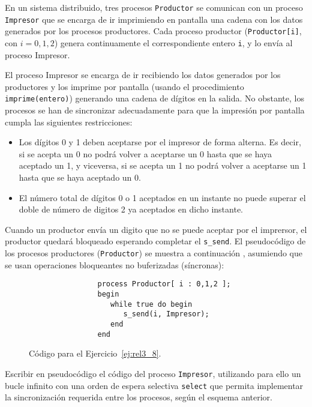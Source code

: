 \begin{ejercicio}\label{ej:rel3_8}
    En un sistema distribuido, tres procesos \verb|Productor| se comunican con un proceso \verb|Impresor| que se encarga de ir imprimiendo en pantalla una cadena con los datos generados por los procesos productores. Cada proceso productor (\verb|Productor[i]|, con $i=0,1,2$) genera continuamente el correspondiente entero \verb|i|, y lo envía al proceso Impresor.

    El proceso Impresor se encarga de ir recibiendo los datos generados por los productores y los imprime por pantalla (usando el procedimiento \verb|imprime(entero)|) generando una cadena de dígitos en la salida. No obstante, los procesos se han de sincronizar adecuadamente para que la impresión por pantalla cumpla las siguientes restricciones:
    \begin{itemize}
        \item Los dígitos 0 y 1 deben aceptarse por el impresor de forma alterna. Es decir, si se acepta un 0 no podrá volver a aceptarse un 0 hasta que se haya aceptado un 1, y viceversa, si se acepta un 1 no podrá volver a aceptarse un 1 hasta que se haya aceptado un 0.
        \item El número total de dígitos 0 o 1 aceptados en un instante no puede superar el doble de número de digitos 2 ya aceptados en dicho instante.
    \end{itemize}
    Cuando un productor envía un digito que no se puede aceptar por el imprersor, el productor quedará bloqueado esperando completar el \verb|s_send|. El pseudocódigo de los procesos productores (\verb|Productor|) se muestra a continuación , asumiendo que se usan operaciones bloqueantes no buferizadas (síncronas):
    \begin{figure}[H]
        \centering
            \begin{verbatim}
                process Productor[ i : 0,1,2 ];
                begin
                   while true do begin
                      s_send(i, Impresor);
                   end
                end
            \end{verbatim}
        \caption{Código para el Ejercicio~\ref{ej:rel3_8}.}
        \label{fig:cod_8}
    \end{figure}
    Escribir en pseudocódigo el código del proceso \verb|Impresor|, utilizando para ello un bucle infinito con una orden de espera selectiva \verb|select| que permita implementar la sincronización requerida entre los procesos, según el esquema anterior.\\


\end{ejercicio}
